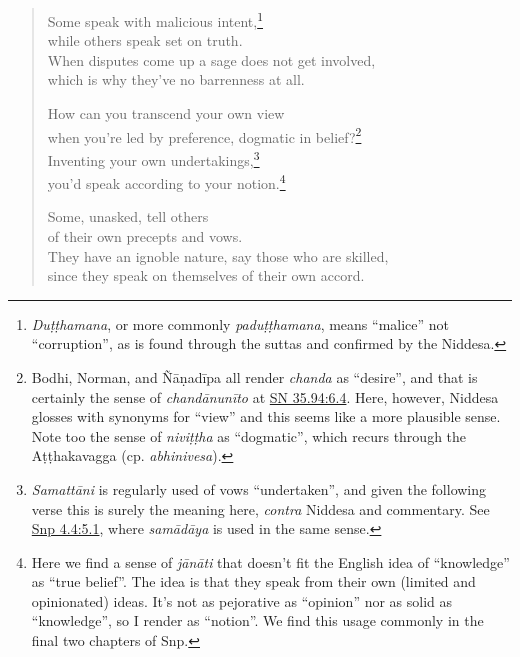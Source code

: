 \documentclass[12pt,openany]{book}%
\begin{document}
\begin{verse}%
Some speak with malicious intent,\footnote{\textit{\textsanskrit{Duṭṭhamana}}, or more commonly \textit{\textsanskrit{paduṭṭhamana}}, means “malice” not “corruption”, as is found through the suttas and confirmed by the Niddesa. } \\
while others speak set on truth. \\
When disputes come up a sage does not get involved, \\
which is why they’ve no barrenness at all. 

How can you transcend your own view \\
when you’re led by preference, dogmatic in belief?\footnote{Bodhi, Norman, and \textsanskrit{Ñāṇadīpa} all render \textit{chanda} as “desire”, and that is certainly the sense of \textit{\textsanskrit{chandānunīto}} at \href{https://suttacentral.net/sn35.94/en/sujato\#6.4}{SN 35.94:6.4}. Here, however, Niddesa glosses with synonyms for “view” and this seems like a more plausible sense. Note too the sense of \textit{\textsanskrit{niviṭṭha}} as “dogmatic”, which recurs through the \textsanskrit{Aṭṭhakavagga} (cp. \textit{abhinivesa}). } \\
Inventing your own undertakings,\footnote{\textit{\textsanskrit{Samattāni}} is regularly used of vows “undertaken”, and given the following verse this is surely the meaning here, \emph{contra} Niddesa and commentary. See \href{https://suttacentral.net/snp4.4/en/sujato\#5.1}{Snp 4.4:5.1}, where \textit{\textsanskrit{samādāya}} is used in the same sense. } \\
you’d speak according to your notion.\footnote{Here we find a sense of \textit{\textsanskrit{jānāti}} that doesn’t fit the English idea of “knowledge” as “true belief”. The idea is that they speak from their own (limited and opinionated) ideas. It’s not as pejorative as “opinion” nor as solid as “knowledge”, so I render as “notion”. We find this usage commonly in the final two chapters of Snp. } 

Some, unasked, tell others \\
of their own precepts and vows. \\
They have an ignoble nature, say those who are skilled, \\
since they speak on themselves of their own accord. 


\end{verse}
\end{document}
